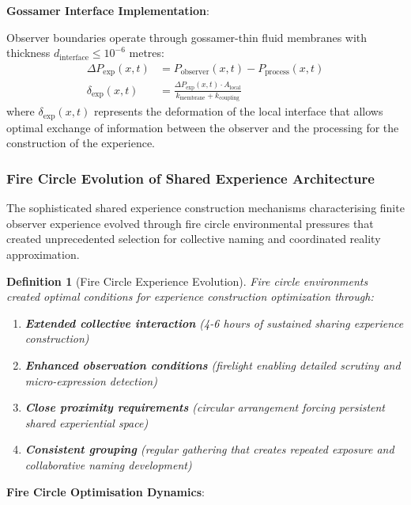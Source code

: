 \documentclass{article}
\newtheorem{definition}[theorem]{Definition}
\begin{document}
\textbf{Gossamer Interface Implementation}:

Observer boundaries operate through gossamer-thin fluid membranes with thickness $d_{\text{interface}} \leq 10^{-6}$ metres:
\begin{align}
\Delta P_{\text{exp}}(x,t) &= P_{\text{observer}}(x,t) - P_{\text{process}}(x,t) \\
\delta_{\text{exp}}(x,t) &= \frac{\Delta P_{\text{exp}}(x,t) \cdot A_{\text{local}}}{k_{\text{membrane}} + k_{\text{coupling}}}
\end{align}
where $\delta_{\text{exp}}(x,t)$ represents the deformation of the local interface that allows optimal exchange of information between the observer and the processing for the construction of the experience.

\subsubsection{Fire Circle Evolution of Shared Experience Architecture}

The sophisticated shared experience construction mechanisms characterising finite observer experience evolved through fire circle environmental pressures that created unprecedented selection for collective naming and coordinated reality approximation.

\begin{definition}[Fire Circle Experience Evolution]
Fire circle environments created optimal conditions for experience construction optimization through:
\begin{enumerate}
\item \textbf{Extended collective interaction} (4-6 hours of sustained sharing experience construction)
\item \textbf{Enhanced observation conditions} (firelight enabling detailed scrutiny and micro-expression detection)
\item \textbf{Close proximity requirements} (circular arrangement forcing persistent shared experiential space)
\item \textbf{Consistent grouping} (regular gathering that creates repeated exposure and collaborative naming development)
\end{enumerate}
\end{definition}

\textbf{Fire Circle Optimisation Dynamics}:
\end{document}
